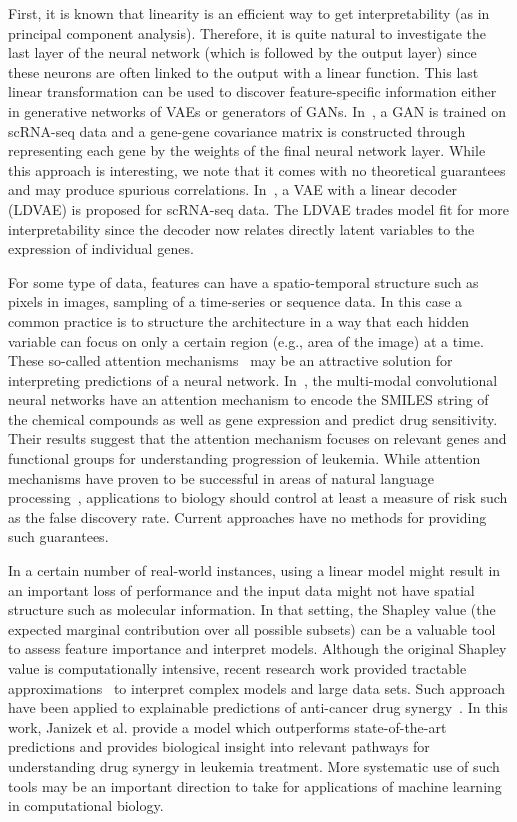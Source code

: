 First, it is known that linearity is an efficient way to get interpretability (as in principal component analysis). Therefore, it is quite natural to investigate the last layer of the neural network (which is followed by the output layer) since these neurons are often linked to the output with a linear function. This last linear transformation can be used to discover feature-specific information either in generative networks of VAEs or generators of GANs. In~\cite{Ghahramani2018}, a GAN is trained on scRNA-seq data and a gene-gene covariance matrix is constructed through representing each gene by the weights of the final neural network layer. While this approach is interesting, we note that it comes with no theoretical guarantees and may produce spurious correlations. In~\cite{Svensson737601}, a VAE with a linear decoder (LDVAE) is proposed for scRNA-seq data. The LDVAE trades model fit for more interpretability since the decoder now relates directly latent variables to the expression of individual genes. 

For some type of data, features can have a spatio-temporal structure such as pixels in images, sampling of a time-series or sequence data. In this case a common practice is to structure the architecture in a way that each hidden variable can focus on only a certain region (e.g., area of the image) at a time. These so-called attention mechanisms~\cite{bahdanau2015} may be an attractive solution for interpreting predictions of a neural network. In~\cite{manica2019}, the multi-modal convolutional neural networks have an attention mechanism to encode the SMILES string of the chemical compounds as well as gene expression and predict drug sensitivity. Their results suggest that the attention mechanism focuses on relevant genes and functional groups for understanding progression of leukemia. While attention mechanisms have proven to be successful in areas of natural language processing~\cite{bahdanau2015}, applications to biology should control at least a measure of risk such as the false discovery rate. Current approaches have no methods for providing such guarantees. 

In a certain number of real-world instances, using a linear model might result in an important loss of performance and the input data might not have spatial structure such as molecular information. In that setting, the Shapley value (the expected marginal contribution over all possible subsets) can be a valuable tool to assess feature importance and interpret models. Although the original Shapley value is computationally intensive, recent research work provided tractable approximations~\cite{NIPS2017_7062} to interpret complex models and large data sets. Such approach have been applied to explainable predictions of anti-cancer drug synergy~\cite{janizek2018explainable}. In this work, Janizek et al. provide a model which outperforms state-of-the-art predictions and provides biological insight into relevant pathways for understanding drug synergy in leukemia treatment. More systematic use of such tools may be an important direction to take for applications of machine learning in computational biology.

